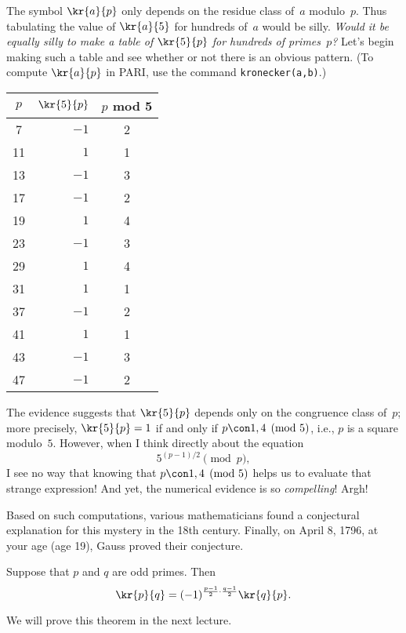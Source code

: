 \documentclass[11pt]{report}
\begin{document}
The symbol $\kr{a}{p}$ only depends on the residue class
of~$a$ modulo~$p$.  Thus tabulating the value of
$\kr{a}{5}$ for hundreds of~$a$ would be silly.
  {\em Would it be equally silly to make a table of $\kr{5}{p}$
    for hundreds of primes~$p$?}  Let's begin making such a table
and see whether or not there is an obvious pattern.
(To compute $\kr{a}{p}$ in PARI, use the command {\tt kronecker(a,b)}.)
\begin{center}
  \begin{tabular}{|crc|}\hline
    $p$ & $\kr{5}{p}$ & $p$ mod 5 \\\hline
    7   & $-1 $       & 2         \\
    11  & $ 1 $       & 1         \\
    13  & $ -1$       & 3         \\
    17  & $ -1$       & 2         \\
    19  & $ 1 $       & 4         \\
    23  & $ -1$       & 3         \\
    29  & $ 1 $       & 4         \\
    31  & $ 1 $       & 1         \\
    37  & $ -1$       & 2         \\
    41  & $ 1 $       & 1         \\
    43  & $ -1$       & 3         \\
    47  & $ -1$       & 2         \\\hline
  \end{tabular}
\end{center}
The evidence suggests that $\kr{5}{p}$ depends only on the
congruence class of~$p$; more precisely, $\kr{5}{p}=1$ if and only
if $p\con 1,4\pmod{5}$, i.e., $p$ is a square modulo~$5$.
However, when I think directly about the equation
$$
  5^{(p-1)/2} \pmod{p},
$$
I see no way that knowing that $p\con 1,4 \pmod{5}$ helps us
to evaluate that strange expression!  And yet, the numerical
evidence is so {\em compelling}!  Argh!


Based on such computations, various mathematicians found a conjectural
explanation for this mystery in the 18th century.  Finally, on April
8, 1796, at your age (age 19), Gauss proved their conjecture.

\begin{theorem}\label{thm:recip}
  Suppose that $p$ and $q$ are odd primes.  Then
  $$\kr{p}{q} = (-1)^{\frac{p-1}{2}\cdot \frac{q-1}{2}}\kr{q}{p}.$$
\end{theorem}
We will prove this theorem in the next lecture.
\end{document}
